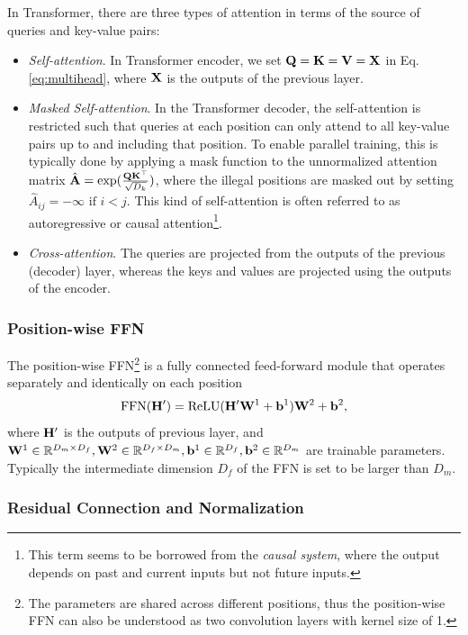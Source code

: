 \documentclass[manuscript,acmsmall,screen,nonacm]{acmart}
\theoremstyle{definition}
\begin{document}
In Transformer, there are three types of attention in terms of the source of queries and key-value pairs:
\begin{itemize}
    \item \textit{Self-attention}. In Transformer encoder, we set $\mathbf{Q}=\mathbf{K}=\mathbf{V}=\mathbf{X}$ in Eq. \eqref{eq:multihead}, where $\mathbf{X}$ is the outputs of the previous layer.
    \item \textit{Masked Self-attention}. In the Transformer decoder, the self-attention is restricted such that queries at each position can only attend to all key-value pairs up to and including that position. To enable parallel training, this is typically done by applying a mask function to the unnormalized attention matrix $\hat{\mathbf{A}}=\exp(\frac{\mathbf{Q}\mathbf{K}^\top}{\sqrt{D_k}})$, where the illegal positions are masked out by setting $\hat{A}_{ij}=-\infty \textrm{ if } i<j$. This kind of self-attention is often referred to as autoregressive or causal attention\footnote{This term seems to be borrowed from the \textit{causal system}, where the output depends on past and current inputs but not future inputs.}.
    \item \textit{Cross-attention}. The queries are projected from the outputs of the previous (decoder) layer, whereas the keys and values are projected using the outputs of the encoder.
\end{itemize}

\subsubsection{Position-wise FFN}
The position-wise FFN\footnote{The parameters are shared across different positions, thus the position-wise FFN can also be understood as two convolution layers with kernel size of 1.} is a fully connected feed-forward module that operates separately and identically on each position
\begin{equation}
    \mathrm{FFN}(\mathbf{H}') = \mathrm{ReLU}(\mathbf{H}'\mathbf{W}^1 + \mathbf{b}^1)\mathbf{W}^2+\mathbf{b}^2,
\end{equation}
where $\mathbf{H}'$ is the outputs of previous layer, and $\mathbf{W}^1\in\mathbb{R}^{D_m\times D_f},\mathbf{W}^2\in\mathbb{R}^{D_f\times D_m},\mathbf{b}^1\in\mathbb{R}^{D_f},\mathbf{b}^2\in\mathbb{R}^{D_m}$ are trainable parameters. Typically the intermediate dimension $D_{f}$ of the FFN is set to be larger than $D_m$.

\subsubsection{Residual Connection and Normalization}
\end{document}
